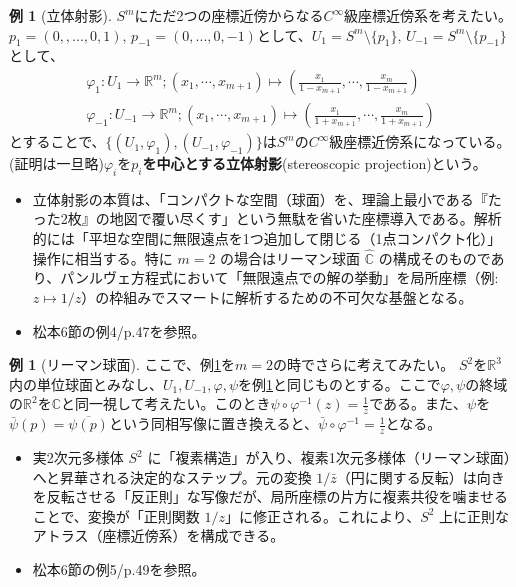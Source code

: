 \documentclass[paper=a4, fontsize=11pt]{jlreq} %
\theoremstyle{definition}
\newtheorem{example}[theorem]{例}
\begin{document}
\begin{example}[立体射影]\label{stereo_proj}
    $S^{m}$にただ2つの座標近傍からなる$C^{\infty}$級座標近傍系を考えたい。
    $p_{1}=(0,,...,0,1),\,p_{-1}=(0,...,0,-1)$として、$U_{1}=S^{m}\setminus\{p_{1}\},\,U_{-1}=S^{m}\setminus\{p_{-1}\}$として、
    \begin{gather*}
    \varphi_{1}:U_{1}\to\mathbb{R}^{m};(x_{1},\cdots,x_{m+1})\mapsto(\frac{x_{1}}{1-x_{m+1}},\cdots,\frac{x_{m}}{1-x_{m+1}})\\
    \varphi_{-1}:U_{-1}\to\mathbb{R}^{m};(x_{1},\cdots,x_{m+1})\mapsto(\frac{x_{1}}{1+x_{m+1}},\cdots,\frac{x_{m}}{1+x_{m+1}})
    \end{gather*}
    とすることで、$\{(U_{1},\varphi_{1}),(U_{-1},\varphi_{-1})\}$は$S^{m}$の$C^{\infty}$級座標近傍系になっている。(証明は一旦略)$\varphi_{i}$を\textbf{$p_{i}$を中心とする立体射影}(stereoscopic projection)という。
    \begin{itemize}
        \item[\textbf{Insight:}] 立体射影の本質は、「コンパクトな空間（球面）を、理論上最小である『たった2枚』の地図で覆い尽くす」という無駄を省いた座標導入である。解析的には「平坦な空間に無限遠点を1つ追加して閉じる（1点コンパクト化）」操作に相当する。特に $m=2$ の場合はリーマン球面 $\hat{\mathbb{C}}$ の構成そのものであり、パンルヴェ方程式において「無限遠点での解の挙動」を局所座標（例: $z \mapsto 1/z$）の枠組みでスマートに解析するための不可欠な基盤となる。
        \item[\textbf{Link:}] 松本6節の例4/p.47を参照。
    \end{itemize}
\end{example}

\begin{example}[リーマン球面]
    ここで、例\ref{stereo_proj}を$m=2$の時でさらに考えてみたい。
    $S^{2}$を$\mathbb{R}^{3}$内の単位球面とみなし、$U_{1},U_{-1},\varphi,\psi$を例\ref{stereo_proj}と同じものとする。ここで$\varphi,\psi$の終域の$\mathbb{R}^{2}$を$\mathbb{C}$と同一視して考えたい。このとき$\psi\circ\varphi^{-1}(z)=\frac{1}{\bar{z}}$である。また、$\psi$を$\bar{\psi}(p)=\overline{\psi(p)}$という同相写像に置き換えると、$\bar{\psi}\circ\varphi^{-1}=\frac{1}{z}$となる。
    \begin{itemize}
        \item[\textbf{Insight:}] 実2次元多様体 $S^2$ に「複素構造」が入り、複素1次元多様体（リーマン球面）へと昇華される決定的なステップ。元の変換 $1/\bar{z}$（円に関する反転）は向きを反転させる「反正則」な写像だが、局所座標の片方に複素共役を噛ませることで、変換が「正則関数 $1/z$」に修正される。これにより、$S^2$ 上に正則なアトラス（座標近傍系）を構成できる。
        \item[\textbf{Link:}] 松本6節の例5/p.49を参照。
    \end{itemize}
\end{example}
\end{document}
